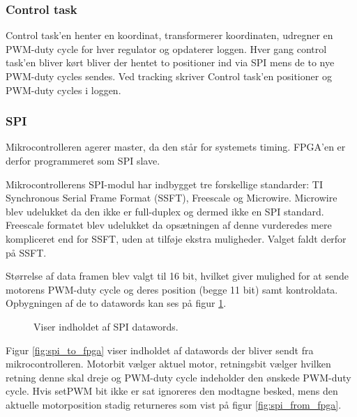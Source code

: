 \subsubsection{Control task}
\label{sec:control_task}
Control task'en henter en koordinat, transformerer koordinaten,
udregner en PWM-duty cycle for hver regulator og opdaterer loggen.
Hver gang control task'en bliver kørt bliver der hentet to positioner
ind via SPI mens de to nye PWM-duty cycles sendes.
Ved tracking skriver Control task'en positioner og PWM-duty cycles i loggen.

\subsubsection{SPI}
\label{sec:spi-implementering}
Mikrocontrolleren agerer master, da den står for systemets timing. FPGA'en er derfor programmeret som SPI slave.

Mikrocontrollerens SPI-modul har indbygget tre forskellige standarder: TI Synchronous Serial Frame Format (SSFT), Freescale og Microwire. 
Microwire blev udelukket da den ikke er full-duplex og dermed ikke en SPI standard. 
Freescale formatet blev udelukket da opsætningen af denne vurderedes mere kompliceret end for SSFT,
uden at tilføje ekstra muligheder.
Valget faldt derfor på SSFT.

Størrelse af data framen blev valgt til 16 bit, hvilket giver mulighed for at sende
motorens PWM-duty cycle og deres position (begge 11 bit) samt kontroldata.
Opbygningen af de to datawords kan ses på figur \ref{fig:protokol1}.

\begin{figure}[h!]
\centering
{}
\qquad
{}
\caption[Indholdet af SPI datawords]{Viser indholdet af SPI datawords. }
\label{fig:protokol1}
\end{figure}

Figur \ref{fig:spi_to_fpga} viser indholdet af datawords der bliver sendt fra mikrocontrolleren. 
Motorbit vælger aktuel motor, retningsbit vælger hvilken retning
denne skal dreje og PWM-duty cycle indeholder den ønskede PWM-duty cycle. 
Hvis setPWM bit ikke er sat ignoreres den modtagne besked,
mens den aktuelle motorposition stadig returneres som vist på figur \ref{fig:spi_from_fpga}. 

